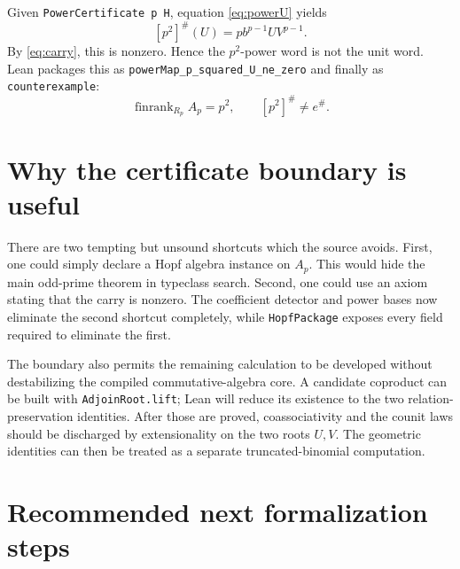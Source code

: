 \documentclass[11pt]{article}
\newcommand{\finrank}{\operatorname{finrank}}
\begin{document}
Given \texttt{PowerCertificate p H}, equation \eqref{eq:powerU} yields
\[
 [p^2]^\#(U)=p b^{p-1}U V^{p-1}.
\]
By \eqref{eq:carry}, this is nonzero.  Hence the $p^2$-power word is not the
unit word.  Lean packages this as
\texttt{powerMap\_p\_squared\_U\_ne\_zero} and finally as
\texttt{counterexample}:
\[
 \finrank_{R_p}A_p=p^2,
 \qquad [p^2]^\#\neq e^\#.
\]

\section{Why the certificate boundary is useful}

There are two tempting but unsound shortcuts which the source avoids.
First, one could simply declare a Hopf algebra instance on $A_p$.  This would
hide the main odd-prime theorem in typeclass search.  Second, one could use an
axiom stating that the carry is nonzero.  The coefficient detector and power
bases now eliminate the second shortcut completely, while
\texttt{HopfPackage} exposes every field required to eliminate the first.

The boundary also permits the remaining calculation to be developed without
destabilizing the compiled commutative-algebra core.  A candidate coproduct
can be built with \texttt{AdjoinRoot.lift}; Lean will reduce its existence to
the two relation-preservation identities.  After those are proved,
coassociativity and the counit laws should be discharged by extensionality on
the two roots $U,V$.  The geometric identities can then be treated as a
separate truncated-binomial computation.

\section{Recommended next formalization steps}
\end{document}
